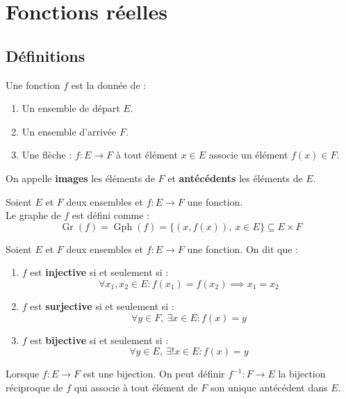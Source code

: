 \chapter{Fonctions réelles}
\def\arraystretch{1}

\section{Définitions}
\begin{definition}[Fonction]
	Une fonction $f$ est la donnée de :
	\begin{enumerate}
		\item Un ensemble de départ $E$.
		\item Un ensemble d'arrivée $F$.
		\item Une flèche : $ f : E \to F $ à tout élément $x \in E$ associe un élément $f(x) \in F$.
	\end{enumerate}		
	On appelle \textbf{images} les éléments de $F$ et \textbf{antécédents} les éléments de $E$.
\end{definition}

\begin{definition}
	Soient $E$ et $F$ deux ensembles et $f : E \longrightarrow F$ une fonction.
	\\
	Le graphe de $f$ est défini comme :
	\[ \operatorname{Gr}(f) = \operatorname{Gph}(f) = \{ (x, f(x)),\ x \in E \} \subseteq E \times F \] 
\end{definition}

\begin{definition}
	Soient $E$ et $F$ deux ensembles et $f : E \to F$ une fonction. On dit que :
    \begin{enumerate}
        \item $f$ est \textbf{injective} si et seulement si : 
        \[ \forall x_1, x_2 \in E : f(x_1) = f(x_2) \implies x_1 = x_2 \]
        \item $f$ est \textbf{surjective} si et seulement si : 
        \[ \forall y \in F,\ \exists x \in E : f(x) = y \]
        \item $f$ est \textbf{bijective} si et seulement si :
        \[ \forall y \in E,\ \exists ! x \in E : f(x) = y \]
    \end{enumerate}
\end{definition}

\begin{definition}
	Lorsque $f : E \longrightarrow F$ est une bijection. On peut définir $f^{-1} : F \to E$ la bijection réciproque de $f$ qui associe à tout élément de $F$ son unique antécédent dans $E$.
\end{definition}

